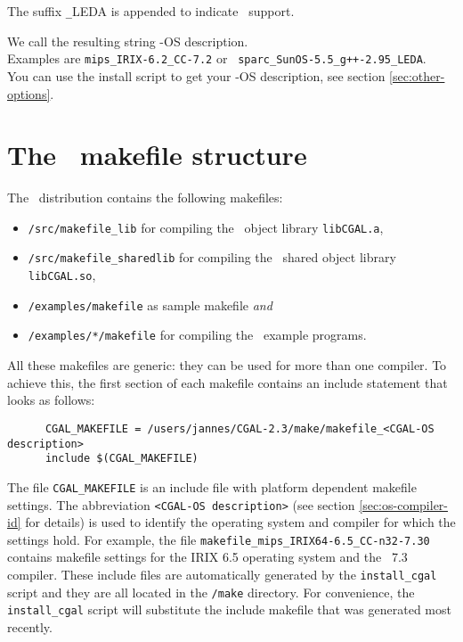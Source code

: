 The suffix \texttt{\_}LEDA is appended to indicate \leda\ support. 

We call the resulting string \cgal-OS description.\\ Examples are
\texttt{mips\_IRIX-6.2\_CC-7.2} or {\tt
  sparc\_SunOS-5.5\_g++-2.95\_LEDA}.\\ You can use the install script
to get your \cgal-OS description, see section \ref{sec:other-options}.

\section{The \cgal\ makefile structure}\label{sec:makefiles}

The \cgal\ distribution contains the following makefiles:
\begin{itemize}
\item \texttt{\cgaldir/src/makefile\_lib} for compiling the \cgal\ 
  object library \texttt{libCGAL.a},
  
\item \texttt{\cgaldir/src/makefile\_sharedlib} for compiling the
  \cgal\ shared object library \texttt{libCGAL.so},
  
\item \texttt{\cgaldir/examples/makefile} as sample makefile
  \textit{and}
  
\item \texttt{\cgaldir/examples/*/makefile} for compiling the \cgal\ 
  example programs.
\end{itemize}

All these makefiles are generic: they can be used for more than one
compiler.  To achieve this, the first section of each makefile
contains an include statement that looks as follows:

\begin{verbatim}
      CGAL_MAKEFILE = /users/jannes/CGAL-2.3/make/makefile_<CGAL-OS description>
      include $(CGAL_MAKEFILE)
\end{verbatim}

The file \texttt{CGAL\_MAKEFILE} is an include
file with platform dependent makefile
settings. The abbreviation \texttt{<CGAL-OS description>} (see section
\ref{sec:os-compiler-id} for details) is used to identify the
operating system and compiler for which the settings hold. For
example, the file \texttt{makefile\_mips\_IRIX64-6.5\_CC-n32-7.30}
contains makefile settings for the IRIX 6.5 operating system and the
\mipsprocc\ 7.3 compiler.  These include files are automatically
generated by the \texttt{install\_cgal} script and they are all
located in the \texttt{\cgaldir/make} directory.  For convenience, the
\texttt{install\_cgal} script will substitute the include makefile
that was generated most recently.

